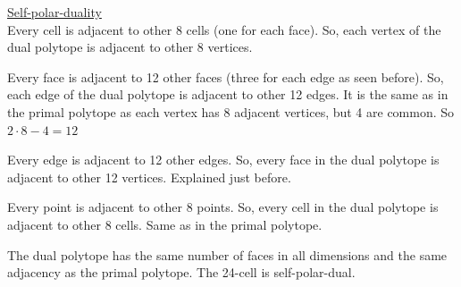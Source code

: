 \documentclass[paper=a4, fontsize=11pt]{scrartcl} %
\theoremstyle{plain}
\begin{document}
\underline{Self-polar-duality} \\

Every cell is adjacent to other 8 cells (one for each face). So, each vertex of the dual polytope is adjacent to other 8 vertices.

Every face is adjacent to 12 other faces (three for each edge as seen before). So, each edge of the dual polytope is adjacent to other 12 edges. It is the same as in the primal polytope as each vertex has 8 adjacent vertices, but 4 are common. So $2 \cdot 8-4=12$

Every edge is adjacent to 12 other edges. So, every face in the dual polytope is adjacent to other 12 vertices. Explained just before.

Every point is adjacent to other 8 points. So, every cell in the dual polytope is adjacent to other 8 cells. Same as in the primal polytope.

The dual polytope has the same number of faces in all dimensions and the same adjacency as the primal polytope. The 24-cell is self-polar-dual.
\end{document}
